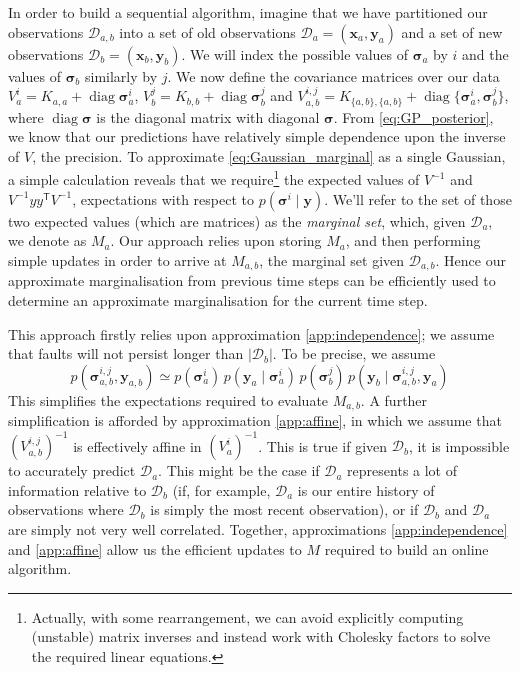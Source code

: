 \documentclass[letterpaper]{article}
\newcommand{\deq}{=}
\newcommand{\given}{\!\ensuremath{\mid}\!}
\newcommand{\cm}[1]{\ensuremath{\mathcal{#1}}}
\newcommand{\bm}[1]{\ensuremath{\mathbf{#1}}}
\newcommand{\data}{\ensuremath{\cm{D}}}
\newcommand{\vect}[1]{\bm{#1}}
\newcommand{\vy}{\vect{y}}
\newcommand{\vx}{\vect{x}}
\newcommand{\vs}{\vect{\sigma}}
\newcommand{\p}[2]{p(#1\given#2)}
\newcommand{\fPr}{p}
\newcommand{\Prob}[2]{\fPr(#1 \given #2 )}
\newcommand{\st}{_{\star}}
\newcommand{\tr}{\ensuremath{\mathsf{T}}}
\DeclareMathOperator{\diag}{diag}
\begin{document}
In order to build a sequential algorithm, imagine that we have partitioned our observations
$\data_{a,b}$ into a set of old observations
$\data_a\deq(\vx_a,\vy_a)$ and a set of new observations $\data_b
\deq (\vx_b,\vy_b)$. We will index the possible values of
$\vs_{a}$ by $i$ and the values of $\vs_{b}$ similarly by
$j$. We now define the covariance matrices over our data
 $V_a^i  \deq K_{a,a} + \diag \vs_{a}^i$,
 $V_b^j  \deq K_{b,b} + \diag \vs_{b}^j$ and
 $V_{a,b}^{i,j} \deq K_{\{a,b\},\{a,b\}} + \diag \{\vs_{a}^i,\vs_{b}^j\}$,
where $\diag \vs$ is the diagonal matrix with diagonal $\vs$. From \eqref{eq:GP_posterior}, we know that our predictions have relatively simple dependence upon the inverse of $V$, the precision. To approximate \eqref{eq:Gaussian_marginal} as a single Gaussian, a simple calculation reveals that we require\footnote{Actually, with some rearrangement, we can avoid explicitly computing (unstable) matrix
inverses and instead work with Cholesky factors to solve the required linear equations.} the expected values of $V^{-1}$ and $V^{-1}y y^\tr V^{-1}$, expectations with respect to $\Prob{\vs^i}{\vy}$.  
We'll refer to the set of those two expected values (which are matrices) as the \emph{marginal set}, which, given $\data_a$, we denote as $M_a$. Our approach relies upon storing $M_a$, and then performing simple updates in order to arrive at $M_{a,b}$, the marginal set given $\data_{a,b}$. Hence our approximate marginalisation from previous time steps can be efficiently used to determine an approximate marginalisation for the current time step. 


This approach firstly relies upon approximation \ref{app:independence}; we assume that faults will not persist longer than $|\data_b|$. To be precise, we assume
\begin{equation} \label{eq:approx}
p(\vs^{i,j}_{a,b},\vy_{a,b})  \simeq p(\vs^i_{a})\,\Prob{\vy_a}{\vs^i_{a}}\,
p(\vs^j_{b})\,\p{\vy_b}{\vs^{i,j}_{a,b},\vy_{a}}
\end{equation}
This simplifies the expectations required to evaluate $M_{a,b}$. A further simplification is afforded by approximation \ref{app:affine}, in which we assume that
$({V}^{i,j}_{a,b})^{-1}$ is effectively affine in $(V^i_a)^{-1}$. This
is true if given $\data_b$, it is impossible to accurately predict
$\data_a$. This might be the case if $\data_a$ represents a lot of
information relative to $\data_b$ (if, for example, $\data_a$ is our
entire history of observations where $\data_b$ is simply the most
recent observation), or if $\data_b$ and $\data_a$ are simply not
very well correlated. Together, approximations \ref{app:independence} and \ref{app:affine} allow us the efficient updates to $M$ required to build an online algorithm.
\end{document}
